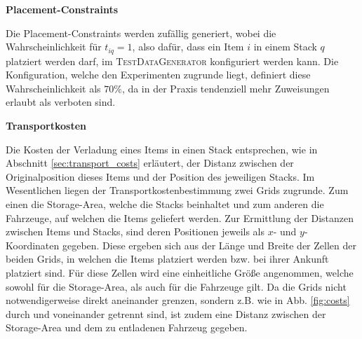 
\textbf{Placement-Constraints}

Die Placement-Constraints werden zufällig generiert, wobei die Wahrscheinlichkeit für $t_{iq} = 1$, also dafür,
dass ein Item $i$ in einem Stack $q$ platziert werden darf, im \textsc{TestDataGenerator} konfiguriert werden kann.
Die Konfiguration, welche den Experimenten zugrunde liegt, definiert diese Wahrscheinlichkeit
als $70 \%$, da in der Praxis tendenziell mehr Zuweisungen erlaubt als verboten sind.

\pagebreak

\textbf{Transportkosten}

Die Kosten der Verladung eines Items in einen Stack entsprechen, wie in Abschnitt
\ref{sec:transport_costs} erläutert, der Distanz zwischen der Originalposition dieses Items und der Position
des jeweiligen Stacks. Im Wesentlichen liegen der Transportkostenbestimmung zwei Grids zugrunde. Zum einen die Storage-Area,
welche die Stacks beinhaltet und zum anderen die Fahrzeuge, auf welchen die Items geliefert werden.
Zur Ermittlung der Distanzen zwischen Items und Stacks, sind deren Positionen jeweils als $x$- und $y$-Koordinaten gegeben.
Diese ergeben sich aus der Länge und Breite der Zellen der beiden Grids, in welchen die Items platziert werden
bzw. bei ihrer Ankunft platziert sind. Für diese Zellen wird eine einheitliche Größe angenommen,
welche sowohl für die Storage-Area, als auch für die Fahrzeuge gilt.
Da die Grids nicht notwendigerweise direkt aneinander grenzen, sondern z.B. wie in Abb. \ref{fig:costs}
durch  und  voneinander getrennt sind, ist zudem eine Distanz
zwischen der Storage-Area und dem zu entladenen Fahrzeug gegeben.

